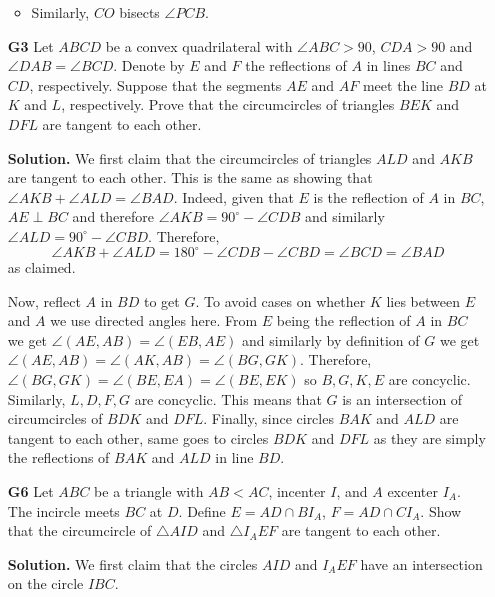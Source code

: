 \documentclass[11pt,a4paper]{article}
\begin{document}
\begin{enumerate}
\begin{itemize}
		\item Similarly, $CO$ bisects $\angle PCB$. 
	\end{itemize}

	\item [\textbf{G3}] Let $ABCD$ be a convex quadrilateral with $\angle ABC>90$, $CDA>90$ and $\angle DAB=\angle BCD$. Denote by $E$ and $F$ the reflections of $A$ in lines $BC$ and $CD$, respectively. Suppose that the segments $AE$ and $AF$ meet the line $BD$ at $K$ and $L$, respectively. Prove that the circumcircles of triangles $BEK$ and $DFL$ are tangent to each other.
	
	\textbf{Solution.} We first claim that the circumcircles of triangles $ALD$ and $AKB$ are tangent to each other. 
	This is the same as showing that $\angle AKB+\angle ALD=\angle BAD$. 
	Indeed, given that $E$ is the reflection of $A$ in $BC$, $AE\perp BC$ and therefore $\angle AKB=90^{\circ}-\angle CDB$ and similarly $\angle ALD=90^{\circ}-\angle CBD$. Therefore, 
	\[
	\angle AKB+\angle ALD=180^{\circ}-\angle CDB-\angle CBD=\angle BCD=\angle BAD
	\]
	as claimed. 
	
	Now, reflect $A$ in $BD$ to get $G$. To avoid cases on whether $K$ lies between $E$ and $A$ we use directed angles here. From $E$ being the reflection of $A$ in $BC$ we get $\angle (AE, AB)=\angle(EB, AE)$ and similarly by definition of $G$ we get $\angle (AE, AB)=\angle(AK, AB)=\angle(BG, GK)$. 
	Therefore, $\angle(BG, GK)=\angle(BE, EA)=\angle(BE, EK)$ so $B, G, K, E$ are concyclic. Similarly, $L, D, F, G$ are concyclic. This means that $G$ is an intersection of circumcircles of $BDK$ and $DFL$. Finally, since circles $BAK$ and $ALD$ are tangent to each other, same goes to circles $BDK$ and $DFL$ as they are simply the reflections of $BAK$ and $ALD$ in line $BD$. 
	
	\item [\textbf{G6}] Let $ABC$ be a triangle with $AB < AC$, incenter $I$, and $A$ excenter $I_{A}$. The incircle meets $BC$ at $D$. Define $E = AD\cap BI_{A}$, $F = AD\cap CI_{A}$. Show that the circumcircle of $\triangle AID$ and $\triangle I_{A}EF$ are tangent to each other. 
	
	\textbf{Solution.} We first claim that the circles $AID$ and $I_AEF$ have an intersection on the circle $IBC$. 
	

\end{enumerate}
\end{document}
